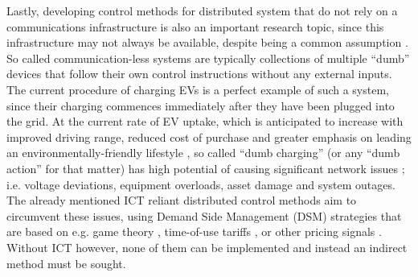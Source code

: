 Lastly, developing control methods for distributed system that do not rely on a communications infrastructure is also an important research topic, since this infrastructure may not always be available, despite being a common assumption \cite{Hatziargyriou2015}.
So called communication-less systems are typically collections of multiple ``dumb'' devices that follow their own control instructions without any external inputs.
The current procedure of charging EVs is a perfect example of such a system, since their charging commences immediately after they have been plugged into the grid.
At the current rate of EV uptake, which is anticipated to increase with improved driving range, reduced cost of purchase and greater emphasis on leading an environmentally-friendly lifestyle \cite{Shah2015}, so called ``dumb charging'' (or any ``dumb action'' for that matter) has high potential of causing significant network issues \cite{Hota2014, Liu2015a}; i.e. voltage deviations, equipment overloads, asset damage and system outages.
The already mentioned ICT reliant distributed control methods aim to circumvent these issues, using Demand Side Management (DSM) strategies that are based on e.g. game theory \cite{Mohsenian-Rad2010}, time-of-use tariffs \cite{Deilami2011, Surles2012}, or other pricing signals \cite{Masoum2015}.
Without ICT however, none of them can be implemented and instead an indirect method must be sought.


